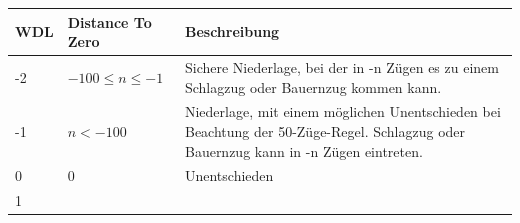 \begin{longtable}[]{@{}lll@{}}
\toprule
\begin{minipage}[b]{0.09\columnwidth}\raggedright\strut
WDL\strut
\end{minipage} & \begin{minipage}[b]{0.28\columnwidth}\raggedright\strut
Distance To Zero\strut
\end{minipage} & \begin{minipage}[b]{0.28\columnwidth}\raggedright\strut
Beschreibung\strut
\end{minipage}\tabularnewline
\midrule
\endhead
\begin{minipage}[t]{0.09\columnwidth}\raggedright\strut
-2\strut
\end{minipage} & \begin{minipage}[t]{0.28\columnwidth}\raggedright\strut
\(-100\leq n\leq-1\)\strut
\end{minipage} & \begin{minipage}[t]{0.28\columnwidth}\raggedright\strut
Sichere Niederlage, bei der in -n Zügen es zu einem Schlagzug oder
Bauernzug kommen kann.\strut
\end{minipage}\tabularnewline
\begin{minipage}[t]{0.09\columnwidth}\raggedright\strut
-1\strut
\end{minipage} & \begin{minipage}[t]{0.28\columnwidth}\raggedright\strut
\(n < -100\)\strut
\end{minipage} & \begin{minipage}[t]{0.28\columnwidth}\raggedright\strut
Niederlage, mit einem möglichen Unentschieden bei Beachtung der
50-Züge-Regel. Schlagzug oder Bauernzug kann in -n Zügen
eintreten.\strut
\end{minipage}\tabularnewline
\begin{minipage}[t]{0.09\columnwidth}\raggedright\strut
0\strut
\end{minipage} & \begin{minipage}[t]{0.28\columnwidth}\raggedright\strut
0\strut
\end{minipage} & \begin{minipage}[t]{0.28\columnwidth}\raggedright\strut
Unentschieden\strut
\end{minipage}\tabularnewline
\begin{minipage}[t]{0.09\columnwidth}\raggedright\strut
1\strut
\end{minipage} & \begin{minipage}[t]{0.28\columnwidth}\raggedright\strut

\end{minipage}
\end{longtable}
